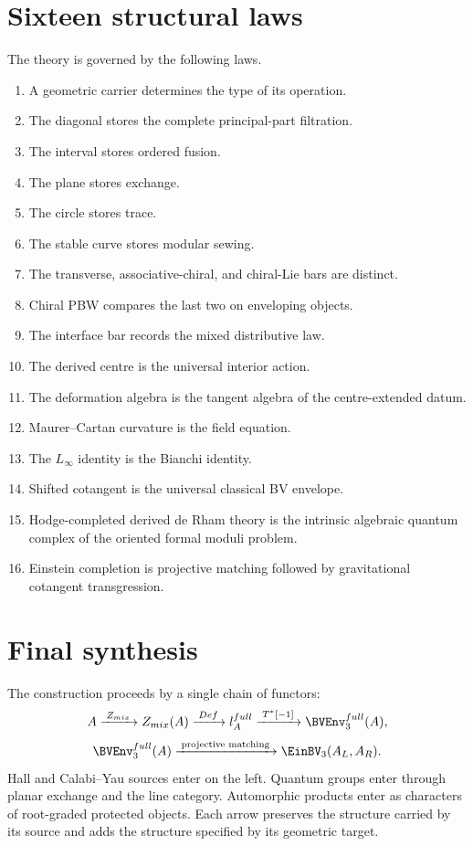 \chapter{Sixteen structural laws}
The theory is governed by the following laws.
\begin{enumerate}
\item A geometric carrier determines the type of its operation.
\item The diagonal stores the complete principal-part filtration.
\item The interval stores ordered fusion.
\item The plane stores exchange.
\item The circle stores trace.
\item The stable curve stores modular sewing.
\item The transverse, associative-chiral, and chiral-Lie bars are distinct.
\item Chiral PBW compares the last two on enveloping objects.
\item The interface bar records the mixed distributive law.
\item The derived centre is the universal interior action.
\item The deformation algebra is the tangent algebra of the centre-extended datum.
\item Maurer--Cartan curvature is the field equation.
\item The $L_\infty$ identity is the Bianchi identity.
\item Shifted cotangent is the universal classical BV envelope.
\item Hodge-completed derived de Rham theory is the intrinsic algebraic quantum complex of the oriented formal moduli problem.
\item Einstein completion is projective matching followed by gravitational cotangent transgression.
\end{enumerate}

\chapter{Final synthesis}
The construction proceeds by a single chain of functors:
\[
\mathbb A
\xrightarrow{\;Z_{\mathrm{mix}}\;}
Z_{\mathrm{mix}}(\mathbb A)
\xrightarrow{\;\operatorname{Def}\;}
\flie_{\mathbb A}^{\mathrm{full}}
\xrightarrow{\;T^*[-1]\;}
\BVEnv_3^{\mathrm{full}}(\mathbb A),
\]
\[
\BVEnv_3^{\mathrm{full}}(\mathbb A)
\xrightarrow{\;\text{projective matching}\;}
\EinBV_3(A_L,A_R).
\]
Hall and Calabi--Yau sources enter on the left.  Quantum groups enter through planar exchange and the line category.  Automorphic products enter as characters of root-graded protected objects.  Each arrow preserves the structure carried by its source and adds the structure specified by its geometric target.

